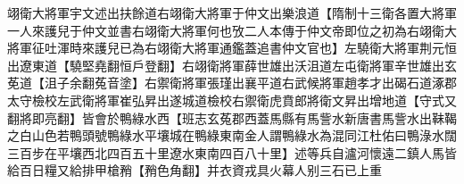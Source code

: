 翊衛大將軍宇文述出扶餘道右翊衛大將軍于仲文出樂浪道【隋制十三衛各置大將軍一人來護兒于仲文並書右翊衛大將軍何也攷二人本傳于仲文帝即位之初為右翊衛大將軍征吐渾時來護兒已為右翊衛大將軍通鑑蓋追書仲文官也】左驍衛大將軍荆元恒出遼東道【驍堅堯翻恒戶登翻】右翊衛將軍薛世雄出沃沮道左屯衛將軍辛世雄出玄莬道【沮子余翻菟音塗】右禦衛將軍張瑾出襄平道右武候將軍趙孝才出碣石道涿郡太守檢校左武衛將軍崔弘昇出遂城道檢校右禦衛虎賁郎將衛文昇出增地道【守式又翻將即亮翻】皆會於鴨綠水西【班志玄菟郡西蓋馬縣有馬訾水新唐書馬訾水出靺鞨之白山色若鴨頭號鴨綠水平壤城在鴨綠東南金人謂鴨綠水為混同江杜佑曰鴨淥水闊三百步在平壤西北四百五十里遼水東南四百八十里】述等兵自瀘河懷遠二鎮人馬皆給百日糧又給排甲槍矟【矟色角翻】并衣資戎具火幕人别三石已上重